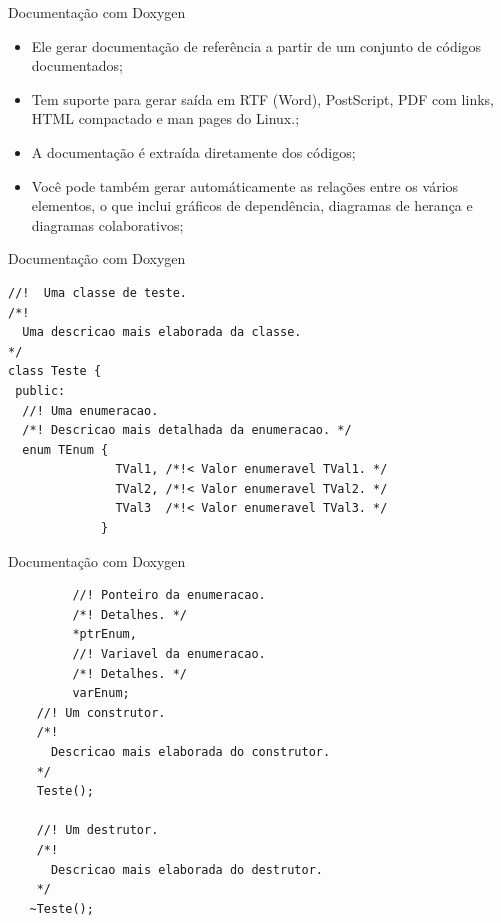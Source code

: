 \documentclass[12pt,table,xcolor={dvipsnames}]{beamer}
\begin{document}
\begin{frame}{Documentação com Doxygen}
\begin{itemize}
\item  Ele gerar  documentação de referência a partir de um conjunto de códigos documentados;
\item  Tem suporte para gerar saída em RTF (Word), PostScript, PDF com links, HTML compactado e man pages do Linux.;
\item A documentação é extraída diretamente dos códigos;
\item Você pode também gerar automáticamente as relações entre os vários elementos, o que inclui gráficos de dependência, diagramas de herança e diagramas colaborativos;
\end{itemize}
\end{frame}

\begin{frame}[fragile]{Documentação com Doxygen}
\begin{lstlisting}
//!  Uma classe de teste.
/*!
  Uma descricao mais elaborada da classe.
*/
class Teste {
 public:
  //! Uma enumeracao.
  /*! Descricao mais detalhada da enumeracao. */
  enum TEnum {
               TVal1, /*!< Valor enumeravel TVal1. */
               TVal2, /*!< Valor enumeravel TVal2. */
               TVal3  /*!< Valor enumeravel TVal3. */
             }

\end{lstlisting}
\end{frame}

\begin{frame}[fragile]{Documentação com Doxygen}
\begin{lstlisting}
         //! Ponteiro da enumeracao.
         /*! Detalhes. */
         *ptrEnum,
         //! Variavel da enumeracao.
         /*! Detalhes. */
         varEnum;
    //! Um construtor.
    /*!
      Descricao mais elaborada do construtor.
    */
    Teste();

    //! Um destrutor.
    /*!
      Descricao mais elaborada do destrutor.
    */
   ~Teste();
\end{lstlisting}
\end{frame}
\end{document}
